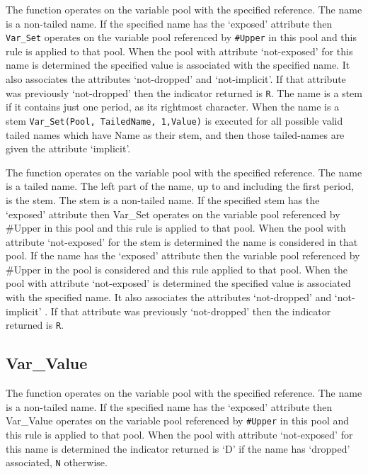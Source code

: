 The function operates on the variable pool with the specified reference.
The name is a non-tailed name. If the specified name has the `exposed'
attribute then \texttt{Var\_Set} operates on the variable pool
referenced by \texttt{\#Upper} in this pool and this rule is applied to
that pool. When the pool with attribute `not-exposed' for this name is
determined the specified value is associated with the specified name. It
also associates the attributes `not-dropped' and `not-implicit'. If that
attribute was previously `not-dropped' then the indicator returned is
\texttt{\textquotesingle{}R\textquotesingle{}}. The name is a stem if it
contains just one period, as its rightmost character. When the name is a
stem
\texttt{Var\_Set(Pool,\ TailedName,\ \textquotesingle{}1\textquotesingle{},Value)}
is executed for all possible valid tailed names which have Name as their
stem, and then those tailed-names are given the attribute `implicit'.



The function operates on the variable pool with the specified reference.
The name is a tailed name. The left part of the name, up to and
including the first period, is the stem. The stem is a non-tailed name.
If the specified stem has the `exposed' attribute then Var\_Set operates
on the variable pool referenced by \#Upper in this pool and this rule is
applied to that pool. When the pool with attribute `not-exposed' for the
stem is determined the name is considered in that pool. If the name has
the `exposed' attribute then the variable pool referenced by \#Upper in
the pool is considered and this rule applied to that pool. When the pool
with attribute `not-exposed' is determined the specified value is
associated with the specified name. It also associates the attributes
`not-dropped' and `not-implicit' . If that attribute was previously
`not-dropped' then the indicator returned is
\texttt{\textquotesingle{}R\textquotesingle{}}.

\subsection{Var\_Value}\label{var_value}



The function operates on the variable pool with the specified reference.
The name is a non-tailed name. If the specified name has the `exposed'
attribute then Var\_Value operates on the variable pool referenced by
\texttt{\#Upper} in this pool and this rule is applied to that pool.
When the pool with attribute `not-exposed' for this name is determined
the indicator returned is `D' if the name has `dropped' associated,
\texttt{\textquotesingle{}N\textquotesingle{}} otherwise.


